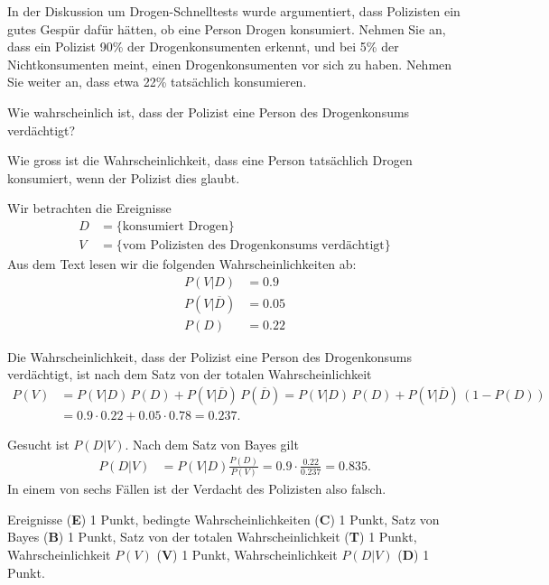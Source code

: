 In der Diskussion um Drogen-Schnelltests wurde argumentiert, dass
Polizisten ein gutes Gespür dafür hätten, ob eine Person Drogen
konsumiert.
Nehmen Sie an, dass ein Polizist 90\% der Drogenkonsumenten erkennt,
und bei 5\% der Nichtkonsumenten meint, einen Drogenkonsumenten vor sich
zu haben.
Nehmen Sie weiter an, dass etwa 22\% tatsächlich konsumieren.
\begin{teilaufgaben}
\item
Wie wahrscheinlich ist, dass der Polizist eine Person des Drogenkonsums
verdächtigt?
\item
Wie gross ist die Wahrscheinlichkeit, dass eine Person tatsächlich Drogen
konsumiert, wenn der Polizist dies glaubt.
\end{teilaufgaben}

\begin{loesung}
Wir betrachten die Ereignisse 
\begin{align*}
D&=\{\text{konsumiert Drogen}\}
\\
V&=\{\text{vom Polizisten des Drogenkonsums verdächtigt}\}
\end{align*}
Aus dem Text lesen wir die folgenden Wahrscheinlichkeiten ab:
\begin{align*}
P(V|D)
&=
0.9
\\
P(V|\overline{D})
&=
0.05
\\
P(D)
&=
0.22
\end{align*}
\begin{teilaufgaben}
\item
Die Wahrscheinlichkeit, dass der Polizist eine Person des Drogenkonsums
verdächtigt, ist nach dem Satz von der totalen Wahrscheinlichkeit
\begin{align*}
P(V)
&=
P(V|D)\,P(D) + P(V|\overline{D})\,P(\overline{D})
=
P(V|D)\,P(D) + P(V|\overline{D})\,(1-P(D))
\\
&=
0.9\cdot 0.22 + 0.05\cdot 0.78
=
0.237.
\end{align*}
\item
Gesucht ist $P(D|V)$.
Nach dem Satz von Bayes gilt
\begin{align*}
P(D|V)
&=
P(V|D)\frac{P(D)}{P(V)}
=
0.9\cdot\frac{0.22}{0.237}
=
0.835.
\end{align*}
In einem von sechs Fällen ist der Verdacht des Polizisten also falsch.
\qedhere
\end{teilaufgaben}
\end{loesung}

\begin{bewertung}
Ereignisse ({\bf E}) 1 Punkt,
bedingte Wahrscheinlichkeiten ({\bf C}) 1 Punkt,
Satz von Bayes ({\bf B}) 1 Punkt,
Satz von der totalen Wahrscheinlichkeit ({\bf T}) 1 Punkt,
Wahrscheinlichkeit $P(V)$ ({\bf V}) 1 Punkt,
Wahrscheinlichkeit $P(D|V)$ ({\bf D}) 1 Punkt.
\end{bewertung}

